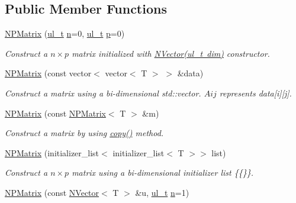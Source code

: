\subsection*{Public Member Functions}
\begin{DoxyCompactItemize}
\item 
\mbox{\hyperlink{class_n_p_matrix_a911b2434435553b06276977f3a86bb87}{N\+P\+Matrix}} (\mbox{\hyperlink{group___n_algebra_ga1b140a2034db3f5dfe18a987745df43a}{ul\+\_\+t}} \mbox{\hyperlink{class_n_p_matrix_afc181b7652d9427125c72c38d7c1498d}{n}}=0, \mbox{\hyperlink{group___n_algebra_ga1b140a2034db3f5dfe18a987745df43a}{ul\+\_\+t}} \mbox{\hyperlink{class_n_p_matrix_a3beee8acb5babf62d2b4f212ac5d18e8}{p}}=0)
\begin{DoxyCompactList}\small\item\em Construct a $ n \times p $ matrix initialized with {\ttfamily \mbox{\hyperlink{class_n_vector_a58eee5f012e4e563d477788051fc7f1d}{N\+Vector(ul\+\_\+t dim)}}} constructor. \end{DoxyCompactList}\item 
\mbox{\hyperlink{class_n_p_matrix_ad5fc4003cdc740be5eed12134929101c}{N\+P\+Matrix}} (const vector$<$ vector$<$ T $>$ $>$ \&data)
\begin{DoxyCompactList}\small\item\em Construct a matrix using a bi-\/dimensional {\ttfamily std\+::vector}. $ Aij $ represents {\ttfamily data\mbox{[}i\mbox{]}\mbox{[}j\mbox{]}}. \end{DoxyCompactList}\item 
\mbox{\hyperlink{class_n_p_matrix_a0965ea26fdfab766bf993ea79fdad13c}{N\+P\+Matrix}} (const \mbox{\hyperlink{class_n_p_matrix}{N\+P\+Matrix}}$<$ T $>$ \&m)
\begin{DoxyCompactList}\small\item\em Construct a matrix by using {\ttfamily \mbox{\hyperlink{class_n_p_matrix_ad2420de13cf39828daf36fd74aea9d2d}{copy()}}} method. \end{DoxyCompactList}\item 
\mbox{\hyperlink{class_n_p_matrix_a738c748de3e3615da067264b629652b0}{N\+P\+Matrix}} (initializer\+\_\+list$<$ initializer\+\_\+list$<$ T $>$$>$ list)
\begin{DoxyCompactList}\small\item\em Construct a $ n \times p $ matrix using a bi-\/dimensional initializer list {\ttfamily \{\{\}\}}. \end{DoxyCompactList}\item 
\mbox{\hyperlink{class_n_p_matrix_a70eca6f9b11e5ab39db67edcba220f34}{N\+P\+Matrix}} (const \mbox{\hyperlink{class_n_vector}{N\+Vector}}$<$ T $>$ \&u, \mbox{\hyperlink{group___n_algebra_ga1b140a2034db3f5dfe18a987745df43a}{ul\+\_\+t}} \mbox{\hyperlink{class_n_p_matrix_afc181b7652d9427125c72c38d7c1498d}{n}}=1)
$$
\end{DoxyCompactItemize}
